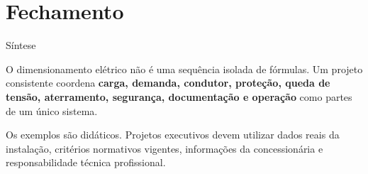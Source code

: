 \section{Fechamento}
\begin{frame}{Síntese}
\small
\begin{caixaProjeto}[title=Competência de projeto]
O dimensionamento elétrico não é uma sequência isolada de fórmulas. Um projeto consistente coordena \textbf{carga, demanda, condutor, proteção, queda de tensão, aterramento, segurança, documentação e operação} como partes de um único sistema.
\end{caixaProjeto}
\vspace{2mm}
\begin{caixaObs}
Os exemplos são didáticos. Projetos executivos devem utilizar dados reais da instalação, critérios normativos vigentes, informações da concessionária e responsabilidade técnica profissional.
\end{caixaObs}
\end{frame}

